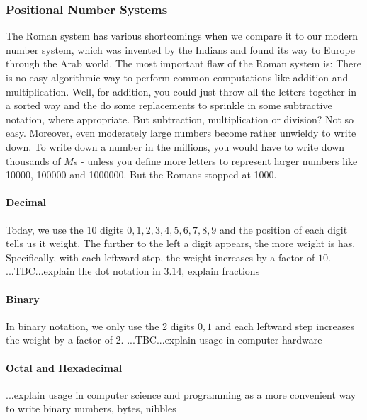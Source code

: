 \subsubsection{Positional Number Systems}
The Roman system has various shortcomings when we compare it to our modern number system, which was invented by the Indians and found its way to Europe through the Arab world. The most important flaw of the Roman system is: There is no easy algorithmic way to perform common computations like addition and multiplication. Well, for addition, you could just throw all the letters together in a sorted way and the do some replacements to sprinkle in some subtractive notation, where appropriate. But subtraction, multiplication or division? Not so easy. Moreover, even moderately large numbers become rather unwieldy to write down. To write down a number in the millions, you would have to write down thousands of $M$s - unless you define more letters to represent larger numbers like 10000, 100000 and 1000000. But the Romans stopped at 1000.



\paragraph{Decimal}
Today, we use the 10 digits $0,1,2,3,4,5,6,7,8,9$ and the position of each digit tells us it weight. The further to the left a digit appears, the more weight is has. Specifically, with each leftward step, the weight increases by a factor of $10$. ...TBC...explain the dot notation in $3.14$, explain fractions




\paragraph{Binary}
In binary notation, we only use the 2 digits $0,1$ and each leftward step increases the weight by a factor of $2$. ...TBC...explain usage in computer hardware

\paragraph{Octal and Hexadecimal}
...explain usage in computer science and programming as a more convenient way to write binary numbers, bytes, nibbles


